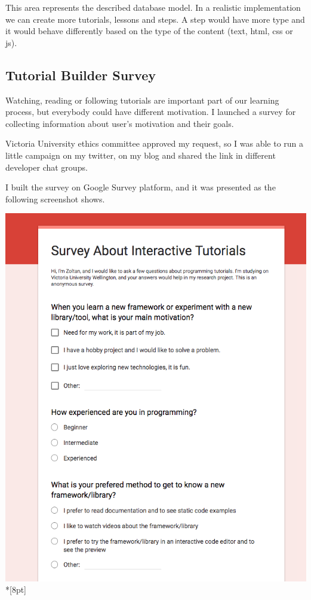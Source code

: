 \documentclass[12pt, a4paper, oneside, openright, medskipamount]{report}
\begin{document}
This area represents the described database model. In a realistic implementation we can create more tutorials, lessons and steps. A step would have more type and it would behave differently based on the type of the content (text, html, css or js).

\newpage

\subsection{Tutorial Builder Survey}

Watching, reading or following tutorials are important part of our learning process, but everybody could have different motivation. I launched a survey for collecting information about user's motivation and their goals.

Victoria University ethics committee approved my request, so I was able to run a little campaign on my twitter, on my blog and shared the link in different developer chat groups.

I built the survey on Google Survey platform, and it was presented as the following screenshot shows.

\includegraphics[width=1\textwidth]{assets/survey-screenshot.png}\\*[8pt]
\end{document}
